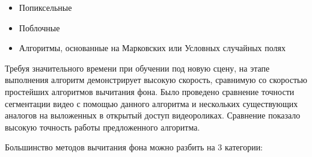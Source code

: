 \documentclass[12pt]{article}
\begin{document}
\begin{itemize}
	\item Попиксельные 
	\item Поблочные
	\item Алгоритмы, основанные на Марковских или Условных случайных полях
\end{itemize}


Требуя значительного времени при обучении под новую сцену, на этапе выполнения алгоритм демонстрирует высокую скорость, сравнимую со скоростью простейших алгоритмов вычитания фона. Было проведено сравнение точности сегментации видео с помощью данного алгоритма и нескольких существующих аналогов на выложенных в открытый доступ видеороликах. Сравнение показало высокую точность работы предложенного алгоритма.

Большинство методов вычитания фона можно разбить на 3
категории:
\end{document}
